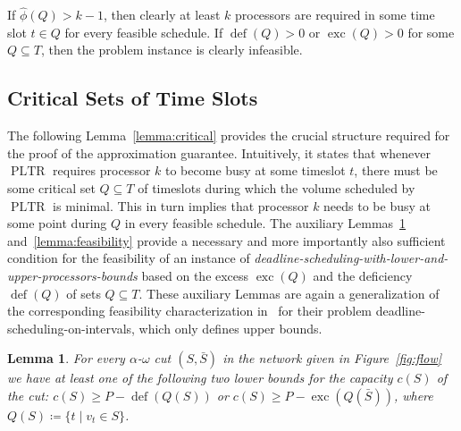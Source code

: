 \documentclass[a4paper]{article}
\DeclareMathOperator{\PLTR}{PLTR}
\DeclareMathOperator{\opdef}{def}
\DeclareMathOperator{\exc}{exc}
\newtheorem{lemma}[theorem]{Lemma}
\begin{document}
If $\hat \phi(Q) > k - 1$, then clearly at least $k$ processors are required in some time slot $t \in Q$ for every feasible schedule.
If $\opdef(Q) > 0$ or $\exc(Q) > 0$ for some $Q \subseteq T$, then the problem instance is clearly infeasible.


\subsection{Critical Sets of Time Slots}
The following Lemma~\ref{lemma:critical} provides the crucial structure required for the proof of the approximation guarantee.
Intuitively, it states that whenever $\PLTR$ requires processor $k$ to become busy at some timeslot $t$, there must be some critical set $Q \subseteq T$ of timeslots during which the volume scheduled by $\PLTR$ is minimal.
This in turn implies that processor $k$ needs to be busy at some point during $Q$ in every feasible schedule.
The auxiliary Lemmas~\ref{lemma:cut} and~\ref{lemma:feasibility} provide a necessary and more importantly also sufficient condition for the feasibility of an instance of \emph{deadline-scheduling-with-lower-and-upper-processors-bounds} based on the excess $\exc(Q)$ and the deficiency $\opdef(Q)$ of sets $Q \subseteq T$.
These auxiliary Lemmas are again a generalization of the corresponding feasibility characterization in~\cite{antoniadis} for their problem deadline-scheduling-on-intervals, which only defines upper bounds.
\begin{lemma}\label{lemma:cut}
  For every $\alpha$-$\omega$ cut $(S, \bar S)$ in the network given in Figure~\ref{fig:flow} we have at least one of the following two lower bounds for the capacity $c(S)$ of the cut:
  $c(S) \geq P - \opdef(Q(S))$ or $c(S) \geq P - \exc(Q(\bar S))$, where $Q(S) \coloneqq \{ t \mid v_t \in S \}$.
\end{lemma}
\end{document}
